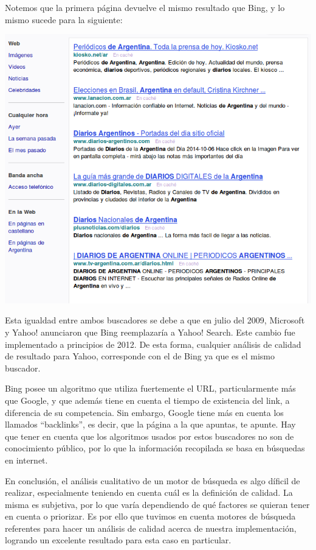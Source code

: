 Notemos que la primera página devuelve el mismo resultado que Bing, y lo mismo sucede para la siguiente:

	\par 
	\begin{center}
		\includegraphics[scale=0.5]{./img/segundapaginayahoo.png}
	\end{center}
	\par

Esta igualdad entre ambos buscadores se debe a que en julio del 2009, Microsoft y Yahoo! anunciaron que Bing reemplazaría a Yahoo! Search. Este cambio fue implementado a principios de 2012. De esta forma, cualquier análisis de calidad de resultado para Yahoo, corresponde con el de Bing ya que es el mismo buscador.
\par 
Bing posee un algoritmo que utiliza fuertemente el URL, particularmente más que Google, y que además tiene en cuenta el tiempo de existencia del link, a diferencia de su competencia. Sin embargo, Google tiene más en cuenta los llamados ``backlinks'', es decir, que la página a la que apuntas, te apunte. Hay que tener en cuenta que los algoritmos usados por estos buscadores no son de conocimiento público, por lo que la información recopilada se basa en búsquedas en internet.
\par 
En conclusión, el análisis cualitativo de un motor de búsqueda es algo díficil de realizar, especialmente teniendo en cuenta cuál es la definición de calidad. La misma es subjetiva, por lo que varía dependiendo de qué factores se quieran tener en cuenta o priorizar. Es por ello que tuvimos en cuenta motores de búsqueda referentes para hacer un análisis de calidad acerca de nuestra implementación, logrando un excelente resultado para esta caso en particular.
	
